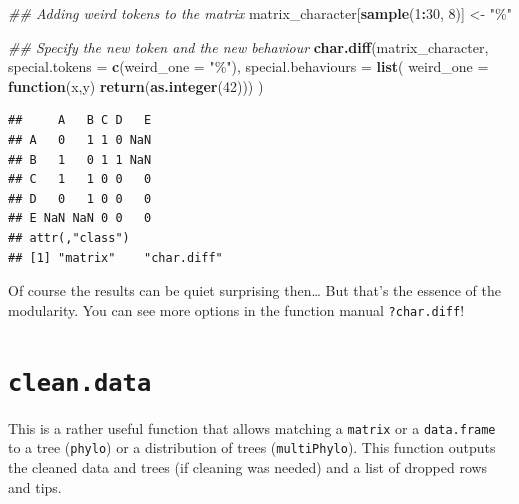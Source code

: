 \documentclass[
]{book}
\newenvironment{Shaded}{\begin{snugshade}}{\end{snugshade}}
\newcommand{\CommentTok}[1]{\textcolor[rgb]{0.56,0.35,0.01}{\textit{#1}}}
\newcommand{\ControlFlowTok}[1]{\textcolor[rgb]{0.13,0.29,0.53}{\textbf{#1}}}
\newcommand{\DataTypeTok}[1]{\textcolor[rgb]{0.13,0.29,0.53}{#1}}
\newcommand{\DecValTok}[1]{\textcolor[rgb]{0.00,0.00,0.81}{#1}}
\newcommand{\KeywordTok}[1]{\textcolor[rgb]{0.13,0.29,0.53}{\textbf{#1}}}
\newcommand{\NormalTok}[1]{#1}
\newcommand{\OperatorTok}[1]{\textcolor[rgb]{0.81,0.36,0.00}{\textbf{#1}}}
\newcommand{\StringTok}[1]{\textcolor[rgb]{0.31,0.60,0.02}{#1}}
\begin{document}
\begin{Shaded}
\begin{Highlighting}[]
\CommentTok{\#\# Adding weird tokens to the matrix}
\NormalTok{matrix\_character[}\KeywordTok{sample}\NormalTok{(}\DecValTok{1}\OperatorTok{:}\DecValTok{30}\NormalTok{, }\DecValTok{8}\NormalTok{)] \textless{}{-}}\StringTok{ "\%"}

\CommentTok{\#\# Specify the new token and the new behaviour}
\KeywordTok{char.diff}\NormalTok{(matrix\_character, }\DataTypeTok{special.tokens =} \KeywordTok{c}\NormalTok{(}\DataTypeTok{weird\_one =} \StringTok{"\%"}\NormalTok{),}
                            \DataTypeTok{special.behaviours =} \KeywordTok{list}\NormalTok{(}
                                \DataTypeTok{weird\_one =} \ControlFlowTok{function}\NormalTok{(x,y) }\KeywordTok{return}\NormalTok{(}\KeywordTok{as.integer}\NormalTok{(}\DecValTok{42}\NormalTok{)))}
\NormalTok{                            )}
\end{Highlighting}
\end{Shaded}

\begin{verbatim}
##     A   B C D   E
## A   0   1 1 0 NaN
## B   1   0 1 1 NaN
## C   1   1 0 0   0
## D   0   1 0 0   0
## E NaN NaN 0 0   0
## attr(,"class")
## [1] "matrix"    "char.diff"
\end{verbatim}

Of course the results can be quiet surprising then\ldots{} But that's the essence of the modularity. You can see more options in the function manual \texttt{?char.diff}!

\hypertarget{clean.data}{%
\section{\texorpdfstring{\texttt{clean.data}}{clean.data}}\label{clean.data}}

This is a rather useful function that allows matching a \texttt{matrix} or a \texttt{data.frame} to a tree (\texttt{phylo}) or a distribution of trees (\texttt{multiPhylo}).
This function outputs the cleaned data and trees (if cleaning was needed) and a list of dropped rows and tips.
\end{document}
